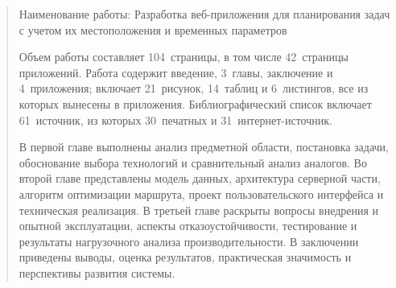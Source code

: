 \pagestyle{empty}
\begin{abstract}
    \thispagestyle{empty}

    Наименование работы: Разработка веб-приложения для планирования задач с учетом их местоположения и временных параметров

    Объем работы составляет 104~страницы, в том числе 42~страницы приложений. Работа содержит введение, 3~главы, заключение и 4~приложения; включает 21~рисунок, 14~таблиц и 6~листингов, все из которых вынесены в приложения. Библиографический список включает 61~источник, из которых 30~печатных и 31~интернет-источник.

    В первой главе выполнены анализ предметной области, постановка задачи, обоснование выбора технологий и сравнительный анализ аналогов. Во второй главе представлены модель данных, архитектура серверной части, алгоритм оптимизации маршрута, проект пользовательского интерфейса и техническая реализация. В третьей главе раскрыты вопросы внедрения и опытной эксплуатации, аспекты отказоустойчивости, тестирование и результаты нагрузочного анализа производительности. В заключении приведены выводы, оценка результатов, практическая значимость и перспективы развития системы.
\end{abstract}
\pagestyle{plain}
